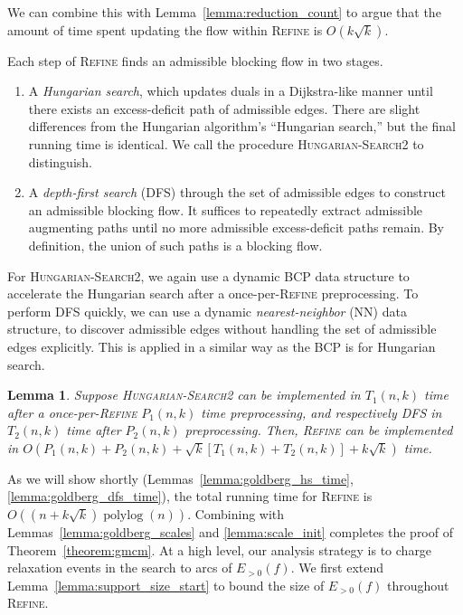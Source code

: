 \documentclass[11pt]{article}
\def\polylog{\mathop{\mathrm{polylog}}}
\theoremstyle{plain}
\newtheorem{lemma}{Lemma}
\begin{document}
We can combine this with Lemma~\ref{lemma:reduction_count} to argue that the
amount of time spent updating the flow within \textsc{Refine} is
$O(k\sqrt{k})$.

Each step of \textsc{Refine} finds an admissible blocking flow in two stages.
\begin{enumerate}
\item A \emph{Hungarian search}, which updates duals in a Dijkstra-like
	manner until there exists an excess-deficit path of admissible edges.
	There are slight differences from the Hungarian algorithm's ``Hungarian
	search,'' but the final running time is identical.
	We call the procedure \textsc{Hungarian-Search2} to distinguish.

\item A \emph{depth-first search} (\textsc{DFS}) through the set of admissible
	edges to construct an admissible blocking flow.
	It suffices to repeatedly extract admissible augmenting paths until
	no more admissible excess-deficit paths remain.
	By definition, the union of such paths is a blocking flow.
\end{enumerate}
For \textsc{Hungarian-Search2}, we again use a dynamic BCP data structure to
accelerate the Hungarian search after a once-per-\textsc{Refine} preprocessing.
To perform \textsc{DFS} quickly, we can use a dynamic \emph{nearest-neighbor}
(NN) data structure, to discover admissible edges without handling the set of
admissible edges explicitly.
This is applied in a similar way as the BCP is for Hungarian search.

\begin{lemma}
Suppose \textsc{Hungarian-Search2} can be implemented in $T_1(n, k)$ time after
a once-per-\textsc{Refine} $P_1(n, k)$ time preprocessing, and respectively
\textsc{DFS} in $T_2(n, k)$ time after $P_2(n, k)$ preprocessing.
Then, \textsc{Refine} can be implemented in
$O(P_1(n, k) + P_2(n, k) + \sqrt{k}[T_1(n, k) + T_2(n, k)] + k\sqrt{k})$ time.
\end{lemma}

As we will show shortly (Lemmas~\ref{lemma:goldberg_hs_time},
\ref{lemma:goldberg_dfs_time}), the total running time for \textsc{Refine} is 
$O((n + k\sqrt{k})\polylog(n))$.
Combining with Lemmas~\ref{lemma:goldberg_scales} and \ref{lemma:scale_init}
completes the proof of Theorem~\ref{theorem:gmcm}.
At a high level, our analysis strategy is to charge relaxation events in 
the search to arcs of $E_{>0}(f)$.
We first extend Lemma~\ref{lemma:support_size_start} to bound the size of 
$E_{>0}(f)$ throughout \textsc{Refine}.
\end{document}
